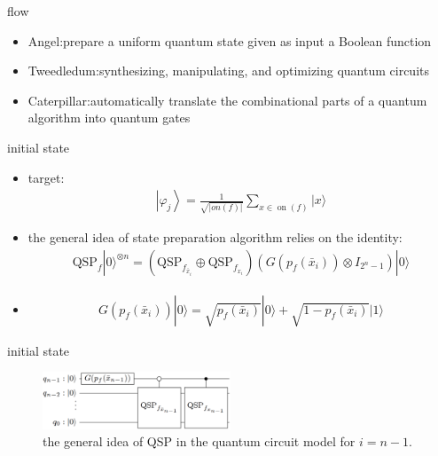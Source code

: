 \begin{frame}{flow}
  \begin{itemize}
    \item Angel:prepare a uniform quantum state
    given as input a Boolean function
    \item Tweedledum:synthesizing,
    manipulating, and optimizing quantum circuits
    \item Caterpillar:automatically translate the combinational parts of a quantum
    algorithm into quantum gates
  \end{itemize}
\end{frame}
\begin{frame}{initial state }
  \begin{itemize}
    \item target:
    \begin{align}
      \left|\varphi_{j}\right\rangle= \frac{1}{\sqrt{|on(f)|}} \sum_{x \in \operatorname{on}(f)}|x\rangle
    \end{align}
    \item the  general  idea  of  state  preparation  algorithm  relies on the identity:
    \begin{align}
      \mathrm{QSP}_{f}|0\rangle^{\otimes n} = \left(\mathrm{QSP}_{f_{\bar{x}_{i}}} \oplus \mathrm{QSP}_{f_{x_{i}}}\right)\left(G\left(p_{f}\left(\bar{x}_{i}\right)\right) \otimes I_{2^{n}-1}\right)|0\rangle
    \end{align}
    \item 
    \begin{align}
      G(p_{f}\left(\bar{x}_{i}\right))|0\rangle = \sqrt{p_{f}\left(\bar{x}_{i}\right)}|0\rangle+\sqrt{1-p_{f}\left(\bar{x}_{i}\right)}|1\rangle
    \end{align}
  \end{itemize}
\end{frame}
\begin{frame}{initial state}
  \begin{figure}[htbq]
    \centering
    \includegraphics[width=0.5\textwidth]{figure/QSP.png}
    \caption{the general idea of QSP in the quantum  circuit  model for $i=n-1$.} 
    \label{fig-qsp}
  \end{figure}
\end{frame}
